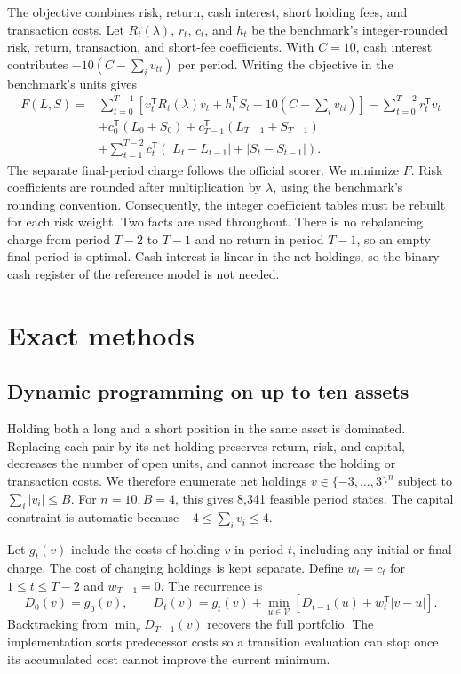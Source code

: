 \documentclass[a4paper]{article}
\begin{document}
The objective combines risk, return, cash interest, short holding fees, and transaction costs.
Let \(R_t(\lambda)\), \(r_t\), \(c_t\), and \(h_t\) be the benchmark's integer-rounded risk, return, transaction,
and short-fee coefficients. With \(C=10\), cash interest contributes \(-10(C-\sum_i v_{ti})\) per period.
Writing the objective in the benchmark's units gives
\begin{equation}
\label{eq:objective}
\begin{aligned}
F(L,S)={}&\sum_{t=0}^{T-1}
\left[v_t^\mathsf{T}R_t(\lambda)v_t+h_t^\mathsf{T}S_t
      -10\left(C-\sum_i v_{ti}\right)\right]
-\sum_{t=0}^{T-2}r_t^\mathsf{T}v_t\\
&+c_0^\mathsf{T}(L_0+S_0)+c_{T-1}^\mathsf{T}(L_{T-1}+S_{T-1})\\
&+\sum_{t=1}^{T-2}c_t^\mathsf{T}
\left(|L_t-L_{t-1}|+|S_t-S_{t-1}|\right).
\end{aligned}
\end{equation}
The separate final-period charge follows the official scorer. We minimize \(F\).
Risk coefficients are rounded after multiplication by \(\lambda\), using the benchmark's rounding convention.
Consequently, the integer coefficient tables must be rebuilt for each risk weight.
Two facts are used throughout. There is no rebalancing charge from period \(T-2\) to \(T-1\) and no return in
period \(T-1\), so an empty final period is optimal. Cash interest is linear in the net holdings, so the binary
cash register of the reference model is not needed.

\section{Exact methods}

\subsection{Dynamic programming on up to ten assets}

Holding both a long and a short position in the same asset is dominated. Replacing each pair by its net holding
preserves return, risk, and capital, decreases the number of open units, and cannot increase the holding or transaction costs.
We therefore enumerate net holdings \(v\in\{-3,\ldots,3\}^{n}\) subject to \(\sum_i|v_i|\le B\).
For \(n=10,B=4\), this gives 8,341 feasible period states. The capital constraint is automatic because
\(-4\le\sum_i v_i\le4\).

Let \(g_t(v)\) include the costs of holding \(v\) in period \(t\), including any initial or final charge.
The cost of changing holdings is kept separate. Define \(w_t=c_t\)
for \(1\le t\le T-2\) and \(w_{T-1}=0\). The recurrence is
\begin{equation}
\label{eq:dp}
D_0(v)=g_0(v),\qquad
D_t(v)=g_t(v)+\min_{u\in\mathcal V}
\left[D_{t-1}(u)+w_t^\mathsf{T}|v-u|\right].
\end{equation}
Backtracking from \(\min_v D_{T-1}(v)\) recovers the full portfolio.
The implementation sorts predecessor costs so a transition evaluation can stop once its accumulated cost
cannot improve the current minimum.
\end{document}
